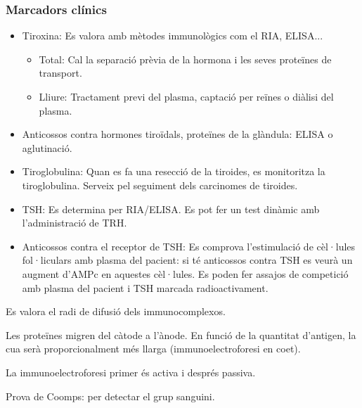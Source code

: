 \subsubsection{Marcadors clínics}
\label{sec:marcadors-clinics}
\begin{itemize}
\item Tiroxina: Es valora amb mètodes immunològics com el RIA, ELISA...
  \begin{itemize}
  \item Total: Cal la separació prèvia de la hormona i les seves
    proteïnes de transport.
  \item Lliure: Tractament previ del plasma, captació per reïnes o
    diàlisi del plasma.
  \end{itemize}

\item Anticossos contra hormones tiroïdals, proteïnes de la glàndula:
  ELISA o aglutinació.

\item Tiroglobulina: Quan es fa una resecció de la tiroides, es
  monitoritza la tiroglobulina. Serveix pel seguiment dels carcinomes
  de tiroides.

\item TSH: Es determina per RIA/ELISA. Es pot fer un test dinàmic amb
  l'administració de TRH.

\item Anticossos contra el receptor de TSH: Es comprova l'estimulació
  de cèl·lules fol·liculars amb plasma del pacient: si té anticossos
  contra TSH es veurà un augment d'AMPc en aquestes cèl·lules. Es
  poden fer assajos de competició amb plasma del pacient i TSH marcada
  radioactivament.
\end{itemize}


Es valora el radi de difusió dels immunocomplexos.

Les proteïnes migren del càtode a l'ànode. En funció de la quantitat
d'antigen, la cua serà proporcionalment més llarga
(immunoelectroforesi en coet).

La immunoelectroforesi primer és activa i després passiva.

Prova de Coomps: per detectar el grup sanguini.